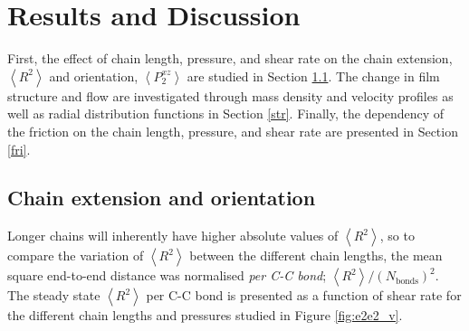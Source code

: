 \documentclass[5p]{elsarticle}
\begin{document}

\section{Results and Discussion}

First, the effect of chain length, pressure, and shear rate on the chain extension, $\left< R^2 \right>$ and orientation, $\left<P_{2}^{xz} \right> $ are studied in Section \ref{ext}. The change in film structure and flow are investigated through mass density and velocity profiles as well as radial distribution functions in Section \ref{str}. Finally, the dependency of the friction on the chain length, pressure, and shear rate are presented in Section \ref{fri}.

\subsection{Chain extension and orientation}
\label{ext}

Longer chains will inherently have higher absolute values of $\left< R^2 \right> $, so to compare the variation of $\left< R^2 \right> $ between the different chain lengths, the mean square end-to-end distance was normalised \emph{per C-C bond}; $\left< R^2 \right>/\left(N_\text{bonds}\right)^2$. The steady state $\left< R^2 \right> $ per C-C bond is presented as a function of shear rate for the different chain lengths and pressures studied in Figure \ref{fig:e2e2_v}.
\end{document}
